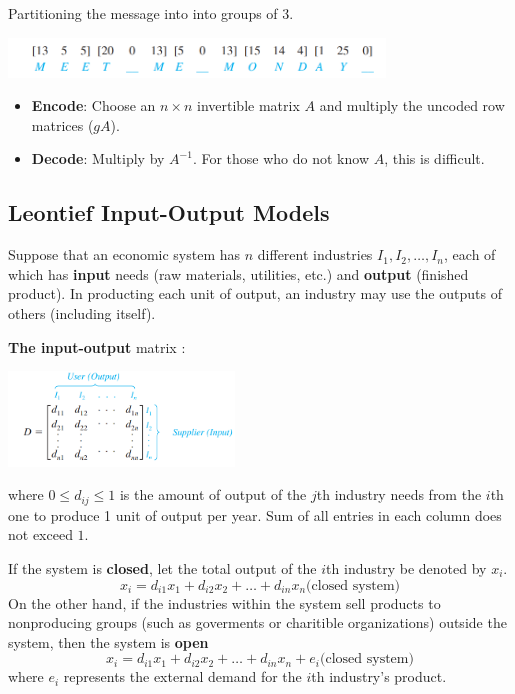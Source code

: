 \documentclass{article}
\newcommand\B{\textbf}
\newcommand\x{\times}
\begin{document}
{    Partitioning the message into into groups of 3.
    \begin{center}
        \includegraphics[width = 10cm]{uncodedrowmatrix0.png}
    \end{center}
    \begin{itemize}
        \item \textbf{Encode}: Choose an $n \x n$ invertible matrix $A$ and multiply the uncoded row matrices ($gA$).
        \item \textbf{Decode}: Multiply by $A^{-1}$. For those who do not know $A$, this is difficult.
    \end{itemize}

    \subsection{Leontief Input-Output Models}

    Suppose that an economic system has $n$ different industries $I_1, I_2, \dots, I_n$, each of which has
    \B{input} needs (raw materials, utilities, etc.) and \B{output} (finished product). In producting
    each unit of output, an industry may use the outputs of others (including itself).

    \textbf{The input-output} matrix :
    \begin{center}
            \includegraphics[width = 6cm]{inputoutput.png}
    \end{center}
    where $0 \leq d_{ij } \leq 1$ is the amount of output of the $j$th industry needs from the $i$th one to produce 1 unit
    of output per year. Sum of all entries in each column does not exceed $1$.

    If the system is \B{closed}, let the total output of the $i$th industry be denoted by $x_i$.
    \[ x_i = d_{i1}x_1 + d_{i2}x_2 + \dots + d_{in}x_n \text{(closed system)}  \]
    On the other hand, if the industries within the system sell products to nonproducing groups
    (such as goverments or charitible organizations) outside the system, then the system is \B{open}
    \[ x_i = d_{i1}x_1 + d_{i2}x_2 + \dots + d_{in}x_n + e_i \text{(closed system)}  \]
    where $e_i$ represents the external demand for the $i$th industry's product.

}
\end{document}
